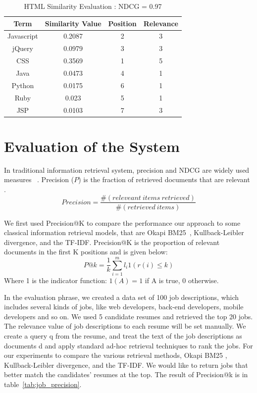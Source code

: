 \begin{table}
\centering
\caption{ HTML Similarity Evaluation : NDCG = 0.97 }
\begin{tabular}{ | c | c | c  | c |  }
 \hline
    Term      &  Similarity Value  &  Position   & Relevance     \\  \hline
  Javascript   &  0.2087           &      2      &   3        \\
     jQuery    &  0.0979           &      3      &   3         \\
     CSS     &  0.3569             &      1      &   5   \\
     Java    &  0.0473             &      4      &   1   \\
    Python   &  0.0175             &      6      &   1   \\
     Ruby    &  0.023              &      5      &   1    \\
     JSP     &  0.0103             &      7      &   3    \\
 \hline
\end{tabular}
\label{tab:simcompare2}
\end{table}


\section{Evaluation of the System}

In traditional information retrieval system, precision and NDCG are widely used measures ~\cite{manning2008introduction}. Precision ($P$) is the fraction of retrieved documents that are relevant .
       $$  Precision =  \frac{ \#(releveant~items~ retrieved)}{ \#(retrieved~items)}$$

We first used Precision@K to compare the performance our approach to some classical information retrieval models, that are Okapi BM25~\cite{robertson2009probabilistic}, Kullback-Leibler divergence, and the TF-IDF. Precision@K is the proportion of relevant documents in the first K positions and is given below:
$$ P@k = \frac{1}{k} \sum^m_{i=1} l_i 1 \left(  r(i) \leq k  \right )  $$
Where 1 is the indicator function: $1(A) = 1$ if A is true, 0 otherwise.

In the evaluation phrase, we created a data set of 100 job descriptions, which includes several kinds of jobs, like web developers, back-end developers, mobile developers and so on. We used 5 candidate resumes and retrieved the top 20 jobs.  The relevance value of job descriptions to each resume will be set manually. We create a query q from the resume, and treat the text of the job descriptions as documents d and apply standard ad-hoc retrieval techniques to rank the jobs. For our experiments to compare the various retrieval methods, Okapi BM25 ,  Kullback-Leibler divergence, and the TF-IDF. We would like to return jobs that better match the candidates' resumes at the top. The result of Precision@k is in table~\ref{tab:job_precision}.


